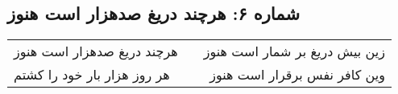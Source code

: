 \begin{center}
\section*{شماره ۶: هرچند دریغ صدهزار است هنوز}
\label{sec:006}
\begin{longtable}{l p{0.5cm} r}
هرچند دریغ صدهزار است هنوز
&&
زین بیش دریغ بر شمار است هنوز
\\
هر روز هزار بار خود را کشتم
&&
وین کافر نفس برقرار است هنوز
\\
\end{longtable}
\end{center}
